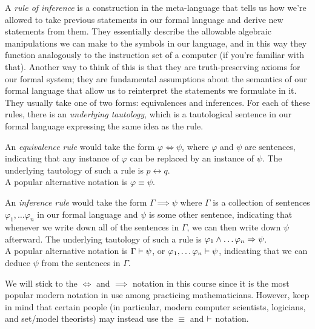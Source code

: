 \begin{definition}
    A \emph{rule of inference} is a construction in the meta-language that tells us
    how we're allowed to take previous statements in our formal language and derive new statements from them.
    They essentially describe the allowable algebraic manipulations we can make to the symbols in our language,
    and in this way they function analogously to the instruction set of a computer
    (if you're familiar with that).
    Another way to think of this is that they are truth-preserving axioms for our formal system;
    they are fundamental assumptions about the semantics of our formal language
    that allow us to reinterpret the statements we formulate in it.
    They usually take one of two forms: equivalences and inferences.
    For each of these rules, there is an \emph{underlying tautology},
    which is a tautological sentence in our formal language expressing the same idea as the rule.

    An \emph{equivalence rule} would take the form \(\varphi \iff \psi\),
    where \(\varphi\) and \(\psi\) are sentences,
    indicating that any instance of \(\varphi\) can be replaced by an instance of \(\psi\).
    The underlying tautology of such a rule is \(p \leftrightarrow q\).
    \\
    A popular alternative notation is \(\varphi \equiv \psi\).

    An \emph{inference rule} would take the form \(\Gamma \implies \psi\)
    where \(\Gamma\) is a collection of sentences
    \(\varphi_1, \dots \varphi_n\) in our formal language
    and \(\psi\) is some other sentence,
    indicating that whenever we write down all of the sentences in \(\Gamma\),
    we can then write down \(\psi\) afterward.
    The underlying tautology of such a rule is
    \(\varphi_1 \wedge \dots \varphi_n \Rightarrow \psi\).
    \\
    A popular alternative notation is \(\Gamma \vdash \psi\), or \(\varphi_1, \dots \varphi_n \vdash \psi\),
    indicating that we can deduce \(\psi\) from the sentences in \(\Gamma\).

    We will stick to the \(\iff\) and \(\implies\) notation in this course
    since it is the most popular modern notation in use among practicing mathematicians.
    However, keep in mind that certain people
    (in particular, modern computer scientists, logicians, and set/model theorists)
    may instead use the \(\equiv\) and \(\vdash\) notation.
\end{definition}

